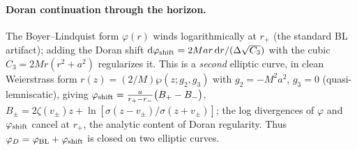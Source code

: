 \documentclass[12pt]{iopart}
\newcommand{\rp}{r_{+}}
\newcommand{\dd}{\mathrm{d}}
\begin{document}
\paragraph{Doran continuation through the horizon.} The Boyer--Lindquist form
$\varphi(r)$ winds logarithmically at $\rp$ (the standard BL artifact); adding the
Doran shift $\dd\varphi_{\rm shift}=2Mar\,\dd r/(\Delta\sqrt{C_3})$ with the cubic
$C_3=2Mr(r^2+a^2)$ regularizes it. This is a \emph{second} elliptic curve, in
clean Weierstrass form $r(z)=(2/M)\wp(z;g_2,g_3)$ with $g_2=-M^2a^2$, $g_3=0$
(quasi-lemniscatic), giving
$\varphi_{\rm shift}=\tfrac{a}{r_+-r_-}\big(B_+-B_-\big)$,
$B_\pm=2\zeta(v_\pm)z+\ln[\sigma(z-v_\pm)/\sigma(z+v_\pm)]$; the log divergences of
$\varphi$ and $\varphi_{\rm shift}$ cancel at $\rp$, the analytic content of Doran
regularity. Thus $\varphi_D=\varphi_{\rm BL}+\varphi_{\rm shift}$ is closed on two
elliptic curves.
\end{document}
